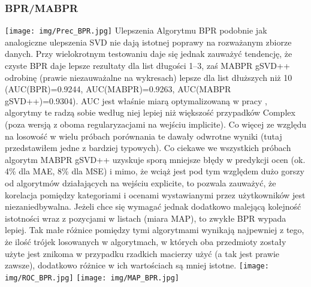 \documentclass{pracamgr}
\begin{document}
    \subsubsection{BPR/MABPR}
     \texttt{[image: img/Prec\_BPR.jpg]}\newline
     Ulepszenia Algorytmu BPR podobnie jak analogiczne ulepszenia SVD nie dają istotnej poprawy na rozważanym zbiorze danych.
     Przy wielokrotnym testowaniu daje się jednak zauważyć tendencję, że czyste BPR daje lepsze rezultaty dla list długości 1--3,
     zaś MABPR gSVD++ odrobinę (prawie niezauważalne na wykresach) lepsze dla list dłuższych niż 10 (AUC(BPR)=0.9244, AUC(MABPR)=0.9263, AUC(MABPR gSVD++)=0.9304).
     AUC jest właśnie miarą optymalizowaną w pracy \cite{191}, algorytmy te radzą sobie według niej lepiej niż większość przypadków Complex
     (poza wersją z oboma regularyzacjami na wejściu implicite).
     Co więcej ze względu na losowość w wielu próbach porównania te dawały odwrotne wyniki (tutaj przedstawiłem jedne z bardziej typowych).
     Co ciekawe we wszystkich próbach algorytm MABPR gSVD++ uzyskuje sporą mniejsze błędy w predykcji ocen (ok. 4\% dla MAE, 8\% dla MSE) i mimo,
     że wciąż jest pod tym względem dużo gorszy od algorytmów działających na wejściu explicite, to pozwala zauważyć,
     że korelacja pomiędzy kategoriami i ocenami wystawianymi przez użytkowników jest niezaniedbywalna.
     Jeżeli chce się wymagać jednak dodatkowo malejącą kolejność istotności wraz z pozycjami w listach (miara MAP), to zwykłe BPR wypada lepiej.
     Tak małe różnice pomiędzy tymi algorytmami wynikają najpewniej z tego, że ilość trójek losowanych w algorytmach, w których oba przedmioty
     zostały użyte jest znikoma w przypadku rzadkich macierzy użyć (a tak jest prawie zawsze), dodatkowo różnice w ich wartościach są mniej istotne.\newline
     \texttt{[image: img/ROC\_BPR.jpg]}
     \texttt{[image: img/MAP\_BPR.jpg]}    
\end{document}
